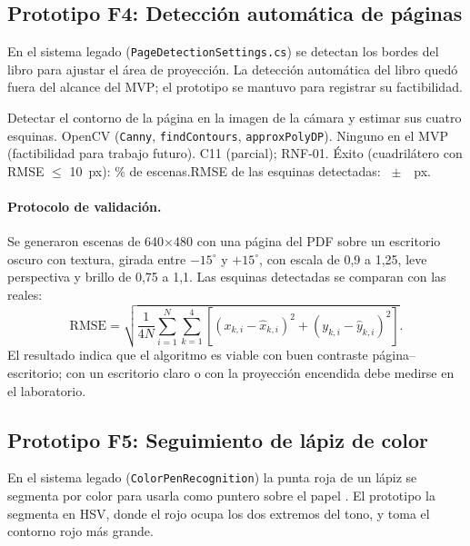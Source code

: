 \subsection{Prototipo F4: Detección automática de páginas}

En el sistema legado (\texttt{PageDetectionSettings.cs}) se detectan los bordes del libro para ajustar el área de proyección. La detección automática del libro quedó fuera del alcance del MVP; el prototipo se mantuvo para registrar su factibilidad.

{Detectar el contorno de la página en la imagen de la cámara y estimar sus cuatro esquinas.}
{OpenCV (\texttt{Canny}, \texttt{findContours}, \texttt{approxPolyDP}).}
{Ninguno en el MVP (factibilidad para trabajo futuro).}
{C11 (parcial); RNF-01.}
{ Éxito (cuadrilátero con RMSE $\leq$ 10~px): \FCuatroExitoPct\% de \FCuatroEscenas{} escenas.\newline RMSE de las esquinas detectadas: \FCuatroRmsePx~$\pm$~\FCuatroRmseSdPx~px.}

\paragraph{Protocolo de validación.} Se generaron \FCuatroEscenas{} escenas de 640$\times$480 con una página del PDF sobre un escritorio oscuro con textura, girada entre $-15^\circ$ y $+15^\circ$, con escala de 0,9 a 1,25, leve perspectiva y brillo de 0,75 a 1,1. Las esquinas detectadas se comparan con las reales:
\begin{equation}
\mathrm{RMSE}=\sqrt{\frac{1}{4N}\sum_{i=1}^{N}\sum_{k=1}^{4}\left[(x_{k,i}-\hat{x}_{k,i})^2+(y_{k,i}-\hat{y}_{k,i})^2\right]}.
\end{equation}
El resultado indica que el algoritmo es viable con buen contraste página--escritorio; con un escritorio claro o con la proyección encendida debe medirse en el laboratorio.

\subsection{Prototipo F5: Seguimiento de lápiz de color}

En el sistema legado (\texttt{ColorPenRecognition}) la punta roja de un lápiz se segmenta por color para usarla como puntero sobre el papel \citep{contreras2019}. El prototipo la segmenta en HSV, donde el rojo ocupa los dos extremos del tono, y toma el contorno rojo más grande.

